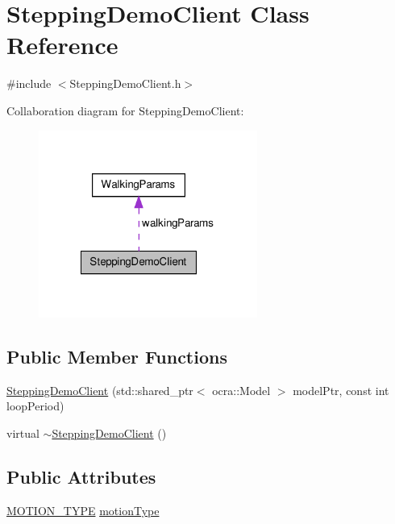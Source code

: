 \hypertarget{classSteppingDemoClient}{\section{\-Stepping\-Demo\-Client \-Class \-Reference}
\label{classSteppingDemoClient}
}


{\ttfamily \#include $<$\-Stepping\-Demo\-Client.\-h$>$}



\-Collaboration diagram for \-Stepping\-Demo\-Client\-:
\nopagebreak
\begin{figure}[H]
\begin{center}
\leavevmode
\includegraphics[width=203pt]{classSteppingDemoClient__coll__graph}
\end{center}
\end{figure}
\subsection*{\-Public \-Member \-Functions}
\begin{DoxyCompactItemize}
\item 
\hyperlink{classSteppingDemoClient_a28e41547ba5641741ceb3b378a5983db}{\-Stepping\-Demo\-Client} (std\-::shared\-\_\-ptr$<$ ocra\-::\-Model $>$ model\-Ptr, const int loop\-Period)
\item 
virtual \hyperlink{classSteppingDemoClient_a573eed904c7262c5cdbaf6e254d72559}{$\sim$\-Stepping\-Demo\-Client} ()
\end{DoxyCompactItemize}
\subsection*{\-Public \-Attributes}
\begin{DoxyCompactItemize}
\item 
\hyperlink{SteppingDemoClient_8h_abd6d177d63e98aa1b4ed4b8329e2a379}{\-M\-O\-T\-I\-O\-N\-\_\-\-T\-Y\-P\-E} \hyperlink{classSteppingDemoClient_aa880debbcbed0298ae1769dd8a3f721b}{motion\-Type}
\end{DoxyCompactItemize}
